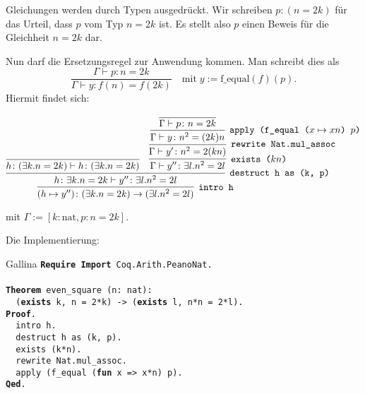 \documentclass[8pt]{beamer}
\newcommand{\parspace}{\vspace{0.8em}}
\newcommand{\kw}[1]{\textbf{#1}}
\begin{document}
\begin{frame}
Gleichungen werden durch Typen ausgedrückt. Wir schreiben
$p\colon (n = 2k)$ für das Urteil, dass $p$ vom Typ $n = 2k$ ist.
Es stellt also $p$ einen Beweis für die Gleichheit $n = 2k$ dar.\pause

\parspace
Nun darf die Ersetzungsregel zur Anwendung kommen. Man schreibt dies als
\[\dfrac{\Gamma\vdash p\colon n = 2k}{\Gamma\vdash y\colon f(n) = f(2k)}
\quad\text{mit}\;y:=\mathrm{f\_equal}(f)(p).\]\pause
Hiermit findet sich:
\begin{small}
\[
\infer[\texttt{intro h}]{(h\mapsto y'')\colon(\exists k. n = 2k)\to (\exists l. n^2 = 2l)}{
  \infer[\texttt{destruct h as (k, p)}]{h\colon\exists k. n = 2k\vdash y''\colon\exists l. n^2 = 2l}{
    \infer{h\colon (\exists k. n = 2k)\vdash h\colon (\exists k. n = 2k)}{}
  & \infer[\texttt{exists ($kn$)}]{\Gamma\vdash y''\colon\exists l. n^2 = 2l}{
      \infer[\texttt{rewrite Nat.mul\_assoc}]{\Gamma\vdash y'\colon n^2 = 2(kn)}{
        \infer[\texttt{apply (f\_equal ($x\mapsto xn$) $p$)}]{\Gamma\vdash y\colon n^2 = (2k)n}{
          \infer{\Gamma\vdash p\colon n = 2k}{}}}}}}
\]
\end{small}
mit $\Gamma:=[k\colon\mathrm{nat}, p\colon n = 2k]$.
\end{frame}

\begin{frame}
Die Implementierung:
\begin{block}{Gallina}
\texttt{\kw{Require} \kw{Import} Coq.Arith.PeanoNat.\\
\mbox{}\\
\kw{Theorem} even\_square (n: nat):\\
\ \ (\kw{exists} k, n = 2*k) -> (\kw{exists} l, n*n = 2*l).\\
\kw{Proof}.\\
\ \ intro h.\\
\ \ destruct h as (k, p).\\
\ \ exists (k*n).\\
\ \ rewrite Nat.mul\_assoc.\\
\ \ apply (f\_equal (\kw{fun} x => x*n) p).\\
\kw{Qed}.}
\end{block}
\end{frame}
\end{document}
